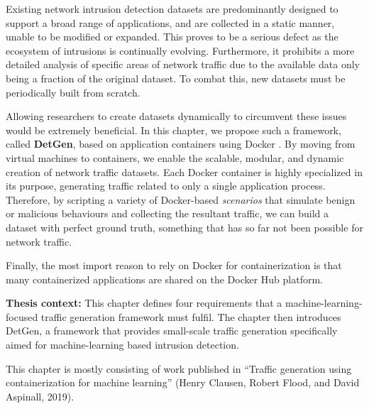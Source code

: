 Existing network intrusion detection datasets are predominantly designed to support a broad range of applications, and are collected in a static manner, unable to be modified or expanded. This proves to be a serious defect as the ecosystem of intrusions is continually evolving.
Furthermore, it prohibits a more detailed analysis of specific areas of network traffic due to the available data only being a fraction of the original dataset. To combat this, new datasets must be periodically built from scratch.

Allowing researchers to create datasets dynamically to circumvent these issues would be extremely beneficial. In this chapter, we propose such a framework, called \textbf{DetGen}, based on application containers using Docker \cite{docker}. %
By moving from virtual machines to containers, we enable the scalable, modular, and dynamic creation of network traffic datasets. %
Each Docker container is highly specialized in its purpose, generating traffic related to only a single application process. Therefore, by scripting a variety of Docker-based \emph{scenarios} that simulate benign or malicious behaviours and collecting the resultant traffic, we can build a dataset with perfect ground truth, something that has so far not been possible for network traffic. 

Finally, the most import reason to rely on Docker for containerization is that many containerized applications are shared on the Docker Hub platform.



\textbf{Thesis context:} This chapter defines four requirements that a machine-learning-focused traffic generation framework must fulfil. The chapter then introduces DetGen, a framework that provides small-scale traffic generation specifically aimed for machine-learning based intrusion detection. 

This chapter is mostly consisting of work published in ``Traffic generation using containerization for machine learning'' (Henry Clausen, Robert Flood, and David Aspinall, 2019).


